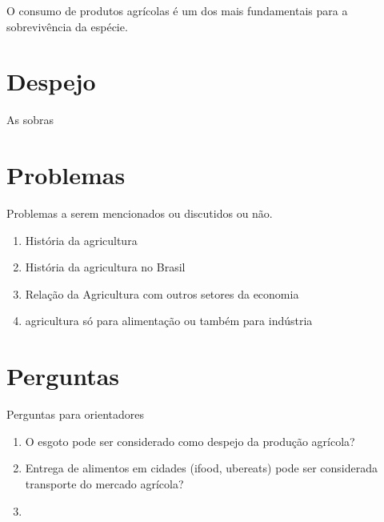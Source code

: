 \documentclass[]{article}
\begin{document}
O consumo de produtos agrícolas é um dos mais fundamentais para a sobrevivência da espécie. 

\section{Despejo}

As sobras 


\section{Problemas}

Problemas a serem mencionados ou discutidos ou não.

\begin{enumerate}
	\item História da agricultura
	
	\item História da agricultura no Brasil
	
	\item Relação da Agricultura com outros setores da economia
	
	\item agricultura só para alimentação ou também para indústria
\end{enumerate}

\section{Perguntas}

Perguntas para orientadores

\begin{enumerate}
	\item O esgoto pode ser considerado como despejo da produção agrícola?
	
	\item Entrega de alimentos em cidades (ifood, ubereats) pode ser considerada transporte do mercado agrícola?
	
	\item 
	
\end{enumerate}
\end{document}
